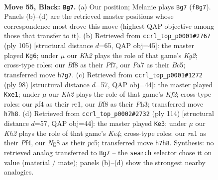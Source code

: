 \documentclass[11pt]{article}
\begin{document}
\clearpage

\begin{figure}[p]\centering
\begin{subfigure}{0.46\textwidth}\centering
\resizebox{\linewidth}{!}{%
\newchessgame
\chessboard[
  setfen={5bn1/p6k/P6p/1p3p2/1P2bP1K/1R6/8/RNr5 b - - 1 55},
  showmover=false,
  pgfstyle=straightmove, color=movearrow, markmove={f8-g7}
]}
\caption{}
\end{subfigure}\hfill
\begin{subfigure}{0.46\textwidth}\centering
\resizebox{\linewidth}{!}{%
\newchessgame
\chessboard[
  setfen={8/5pk1/1r2p2p/1Nbn4/5P1P/1R4P1/4B1K1/8 b - - 12 53},
  showmover=false,
  pgfstyle=straightmove, color=movearrow, markmove={g7-g6}
]}
\caption{}
\end{subfigure}
\\[4pt]
\begin{subfigure}{0.46\textwidth}\centering
\resizebox{\linewidth}{!}{%
\newchessgame
\chessboard[
  setfen={8/1p3k2/p1pr1n1p/5R2/2P5/2B2P1P/1P3K2/4r3 w - - 0 50},
  showmover=false,
  pgfstyle=straightmove, color=movearrow, markmove={f2-e1}
]}
\caption{}
\end{subfigure}\hfill
\begin{subfigure}{0.46\textwidth}\centering
\resizebox{\linewidth}{!}{%
\newchessgame
\chessboard[
  setfen={4k3/1R2n3/1p2r1p1/p1p1B1P1/P3KP2/8/1P6/8 w - - 8 58},
  showmover=false,
  pgfstyle=straightmove, color=movearrow, markmove={e4-e3}
]}
\caption{}
\end{subfigure}
\caption{\textbf{Move 55, Black: \texttt{Bg7}.} (a) Our position; Melanie plays \texttt{Bg7} (\texttt{f8g7}). Panels (b)--(d) are the retrieved master positions whose correspondence most drove this move (highest QAP objective among those that transfer to it). (b) Retrieved from \texttt{ccrl\_top\_p0001\#2767} (ply 105) [structural distance $d$=65, QAP obj=45]: the master played \texttt{Kg6}; under $\mu$ our \emph{Kh2} plays the role of that game's \emph{Kg2}; cross-type roles: our \emph{B}f8 as their \emph{P}f7, our \emph{P}a7 as their \emph{B}c5; transferred move \texttt{h7g7}. (c) Retrieved from \texttt{ccrl\_top\_p0001\#1272} (ply 98) [structural distance $d$=57, QAP obj=44]: the master played \texttt{Kxe1}; under $\mu$ our \emph{Kh2} plays the role of that game's \emph{Kf2}; cross-type roles: our \emph{p}f4 as their \emph{r}e1, our \emph{B}f8 as their \emph{P}h3; transferred move \texttt{h7h8}. (d) Retrieved from \texttt{ccrl\_top\_p0002\#2732} (ply 114) [structural distance $d$=57, QAP obj=44]: the master played \texttt{Ke3}; under $\mu$ our \emph{Kh2} plays the role of that game's \emph{Ke4}; cross-type roles: our \emph{r}a1 as their \emph{P}f4, our \emph{N}g8 as their \emph{p}c5; transferred move \texttt{h7h8}. Synthesis: no retrieved analog transferred to \texttt{Bg7} -- the \texttt{search} selector chose it on value (material / mate); panels (b)--(d) show the strongest nearby analogies.}
\label{fig:thought-m109}
\end{figure}
\end{document}
